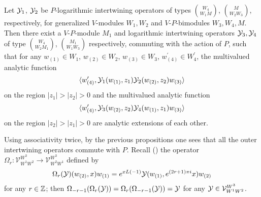 \documentclass[12pt]{article}
\begin{document}
\begin{thm} \label{commut1}
  Let $\mathcal{Y}_1$, $\mathcal{Y}_2$ be $P$-logarithmic intertwining operators of types $\binom{W_4}{W_1 M}$,
  $\binom{M}{W_2 W_3}$, respectively, for generalized $V$-modules
  $W_1, W_2$ and $V$-$P$-bimodules $W_3, W_4, M$. 
  Then there exist a $V$-$P$-module $M_1$ and logarithmic intertwining
  operators $\mathcal{Y}_3, \mathcal{Y}_4$ of type $\binom{W_4}{W_2 M_1}$, $\binom{M_1}{W_1 W_3}$
  respectively, commuting with the action of $P$, such that for any
  $w_{(1)}\in W_1$, $w_{(2)}\in W_2$, $w_{(3)}\in W_3$,
  $w_{(4)}^\prime \in W_4^\prime$, the multivalued analytic function
  \begin{equation*}
    \langle w_{(4)}^\prime, \mathcal{Y}_1(w_{(1)}, z_1)\mathcal{Y}_2(w_{(2)}, z_2) w_{(3)}\rangle
  \end{equation*}
  on the region $|z_1|>|z_2|>0$ and the multivalued analytic function
  \begin{equation*}
    \langle w_{(4)}^\prime, \mathcal{Y}_3(w_{(2)}, z_2)\mathcal{Y}_4(w_{(1)}, z_1) w_{(3)}\rangle
  \end{equation*}
  on the region $|z_2|>|z_1|>0$ are analytic extensions of each other.
\end{thm}
\proof
  Using associativity twice, by the previous propositions one sees that all the outer
  intertwining operators commute with $P$.
  Recall (\cite{HLZ2}) the operator
  $\Omega_r : \mathcal V_{W^1W^2}^{W^3}
  \rightarrow \mathcal V_{W^2W^1}^{W^3}$ defined by
  \begin{align*}
    \Omega_r(\mathcal{Y})(w_{(2)}, x)w_{(1)} = 
    e^{xL(-1)} \mathcal{Y}(w_{(1)}, e^{(2r+1)\pi i} x) w_{(2)}
  \end{align*}
  for any $r\in \mathbb{Z}$;
  then $\Omega_{-r-1}(\Omega_r(\mathcal{Y})) = 
  \Omega_{r}(\Omega_{-r-1}(\mathcal{Y})) = \mathcal{Y}$ for any $\mathcal{Y} \in \mathcal V_{W^1W^2}^{W^3}$.
  
\end{document}
